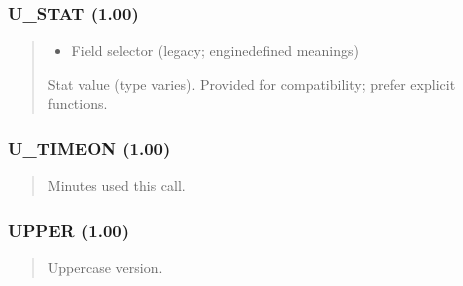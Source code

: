 \documentclass[letterpaper,10pt,english]{sphinxmanual}
\begin{document}
\subsubsection{U\_STAT (1.00)}
\label{\detokenize{ppl:u-stat-1-00}}\begin{quote}

\sphinxAtStartPar
{}
\begin{description}
\begin{itemize}
\item {} 
\sphinxAtStartPar
{} \textendash{} Field selector (legacy; engine\sphinxhyphen{}defined meanings)

\end{itemize}

\sphinxAtStartPar
Stat value (type varies). Provided for compatibility; prefer explicit functions.

\end{description}
\end{quote}


\subsubsection{U\_TIMEON (1.00)}
\label{\detokenize{ppl:u-timeon-1-00}}\begin{quote}

\sphinxAtStartPar
{}
\begin{description}
\sphinxAtStartPar
Minutes used this call.

\end{description}
\end{quote}


\subsubsection{UPPER (1.00)}
\label{\detokenize{ppl:upper-1-00}}\begin{quote}

\sphinxAtStartPar
{}
\begin{description}
\sphinxAtStartPar
Upper\sphinxhyphen{}case version.

\end{description}
\end{quote}
\end{document}
